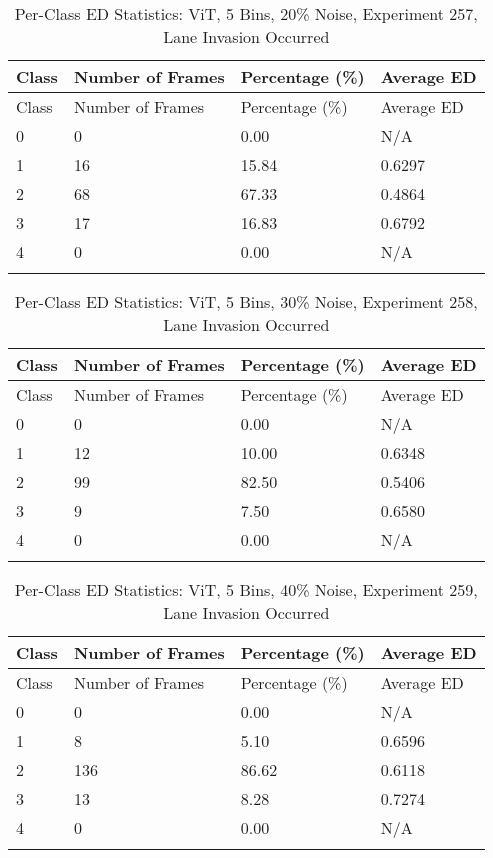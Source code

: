 
\begin{longtable}{@{}llll@{}}
\toprule
Class & Number of Frames & Percentage (\%) & Average ED \\
\midrule
\endfirsthead
\toprule
Class & Number of Frames & Percentage (\%) & Average ED \\
\midrule
\endhead
0 & 0 & 0.00 & N/A \\
1 & 16 & 15.84 & 0.6297 \\
2 & 68 & 67.33 & 0.4864 \\
3 & 17 & 16.83 & 0.6792 \\
4 & 0 & 0.00 & N/A \\
\bottomrule
\caption{Per-Class ED Statistics: ViT, 5 Bins, 20\% Noise, Experiment 257, Lane Invasion Occurred}
\label{tab:exp257_ViT_5bins_20noise}
\end{longtable}
        


\begin{longtable}{@{}llll@{}}
\toprule
Class & Number of Frames & Percentage (\%) & Average ED \\
\midrule
\endfirsthead
\toprule
Class & Number of Frames & Percentage (\%) & Average ED \\
\midrule
\endhead
0 & 0 & 0.00 & N/A \\
1 & 12 & 10.00 & 0.6348 \\
2 & 99 & 82.50 & 0.5406 \\
3 & 9 & 7.50 & 0.6580 \\
4 & 0 & 0.00 & N/A \\
\bottomrule
\caption{Per-Class ED Statistics: ViT, 5 Bins, 30\% Noise, Experiment 258, Lane Invasion Occurred}
\label{tab:exp258_ViT_5bins_30noise}
\end{longtable}
        


\begin{longtable}{@{}llll@{}}
\toprule
Class & Number of Frames & Percentage (\%) & Average ED \\
\midrule
\endfirsthead
\toprule
Class & Number of Frames & Percentage (\%) & Average ED \\
\midrule
\endhead
0 & 0 & 0.00 & N/A \\
1 & 8 & 5.10 & 0.6596 \\
2 & 136 & 86.62 & 0.6118 \\
3 & 13 & 8.28 & 0.7274 \\
4 & 0 & 0.00 & N/A \\
\bottomrule
\caption{Per-Class ED Statistics: ViT, 5 Bins, 40\% Noise, Experiment 259, Lane Invasion Occurred}
\label{tab:exp259_ViT_5bins_40noise}
\end{longtable}
        

